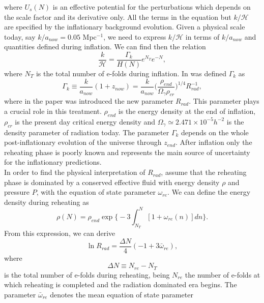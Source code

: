 \documentclass[11pt,a4paper,twoside]{book}
\begin{document}
where $ U_{s}(N) $ is an effective potential for the perturbations which depends on the scale factor and its derivative only. All the terms in the equation but $ k/\mathcal{H} $ are specified by the inflationary background evolution. Given  a physical scale today, say $ k/a_{now}=0.05 $ Mpc$^{-1} $, we need to express $ k/\mathcal{H} $ in terms of $ k/a_{now} $ and quantities defined during inflation. We can find then the relation
\begin{equation}
\label{Chap3:kH}
\frac{k}{\mathcal{H}}=\frac{\Gamma_{k}}{H(N)}e^{N_{T}}e^{-N},
\end{equation}
where $ N_{T} $ is the total number of e-folds during inflation. In \cite{Chap3:Martin_Ringeval} was defined $\Gamma_{k}$ as
\begin{equation}
	\label{Chap3:Gammak}
	\Gamma_{k}\equiv \frac{k}{a_{now}}(1+z_{now}) = \frac{k}{a_{now}}\Bigg(\frac{\rho_{end}}{\Omega_{\gamma}\rho_{cr}}\Bigg)^{1/4}R^{-1}_{rad},
\end{equation}
where in the paper was introduced the new parameter $ R_{rad} $. This parameter plays a crucial role in this treatment. $\rho_{end}$ is the energy density at the end of inflation, $\rho_{cr}$ is the present day critical energy density and $\Omega_{\gamma} \simeq 2.471 \times 10^{-5} h^{-2}$ is the density parameter of radiation today.
The parameter $ \Gamma_{k} $ depends on the whole post-inflationary evolution of the universe through $ z_{end} $. After inflation only the reheating phase is poorly known and represents the main source of uncertainty for the inflationary predictions.\\
In order to find the physical interpretation of $ R_{rad} $, assume that the reheating phase is dominated by a conserved effective fluid with energy density $\rho$ and pressure $ P $, with the equation of state parameter $\omega_{re}$.  We can define the energy density during reheating as
\begin{equation}
	\label{Chap3:energyDensityDuringReheating}
	\rho(N) = \rho_{end} \exp \Biggl\{-3 \int_{N_{T}}^{N}[1+\omega_{re}(n)]dn\Biggr\}.
\end{equation}
From this expression, we can derive
\begin{equation}
\label{Chap3:lnRad}
\ln R_{rad} = \frac{\Delta N}{4}(-1 + 3\bar{\omega}_{re}),
\end{equation}
where 
\begin{equation}
	\Delta N \equiv N_{re} - N_{T}
\end{equation}
is the total number of e-folds during reheating, being $ N_{re} $ the number of e-folds at which reheating is completed and the radiation dominated era begins. The parameter $\bar{\omega}_{re}$ denotes the mean equation of state parameter
\end{document}
